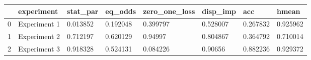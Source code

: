 \begin{tabular}{llllllll}
\toprule
{} &    experiment &  stat\_par &   eq\_odds & zero\_one\_loss &  disp\_imp &       acc &     hmean \\
\midrule
0 &  Experiment 1 &  0.013852 &  0.192048 &      0.399797 &  0.528007 &  0.267832 &  0.925962 \\
1 &  Experiment 2 &  0.712197 &  0.620129 &       0.94997 &  0.804867 &  0.364792 &  0.710014 \\
2 &  Experiment 3 &  0.918328 &  0.524131 &      0.084226 &   0.90656 &  0.882236 &  0.929372 \\
\bottomrule
\end{tabular}
